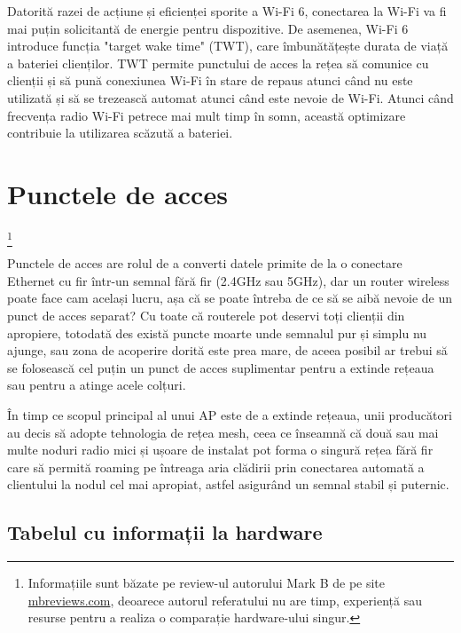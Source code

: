 \documentclass[a4paper,12pt]{report}
\def\oldchapter{} \let\oldchapter=\chapter{}
\def\chapter{\stepcounter{num_chapters}\oldchapter}
\begin{document}
Datorită razei de acțiune și eficienței sporite a Wi-Fi 6, conectarea la Wi-Fi va fi mai puțin solicitantă de energie pentru dispozitive.
De asemenea, Wi-Fi 6 introduce funcția "target wake time" (TWT), care îmbunătățește durata de viață a bateriei clienților.
TWT permite punctului de acces la rețea să comunice cu clienții și să pună conexiunea Wi-Fi în stare de repaus atunci când nu este utilizată și să se trezească automat atunci când este nevoie de Wi-Fi.
Atunci când frecvența radio Wi-Fi petrece mai mult timp în somn, această optimizare contribuie la utilizarea scăzută a bateriei.


\chapter{Punctele de acces}

\footnote{Informațiile sunt băzate pe review-ul autorului Mark B de pe site \url{mbreviews.com}, deoarece autorul referatului nu are timp, experiență sau resurse pentru a realiza o comparație hardware-ului singur.}

Punctele de acces are rolul de a converti datele primite de la o conectare Ethernet cu fir într-un semnal fără fir (2.4GHz sau 5GHz), dar un router wireless poate face cam același lucru, așa că se poate întreba de ce să se aibă nevoie de un punct de acces separat?
Cu toate că routerele pot deservi toți clienții din apropiere, totodată des există puncte moarte unde semnalul pur și simplu nu ajunge, sau zona de acoperire dorită este prea mare, de aceea posibil ar trebui să se folosească cel puțin un punct de acces suplimentar pentru a extinde rețeaua sau pentru a atinge acele colțuri.

În timp ce scopul principal al unui AP este de a extinde rețeaua, unii producători au decis să adopte tehnologia de rețea mesh, ceea ce înseamnă că două sau mai multe noduri radio mici și ușoare de instalat pot forma o singură rețea fără fir care să permită roaming pe întreaga aria clădirii prin conectarea automată a clientului la nodul cel mai apropiat, astfel asigurând un semnal stabil și puternic.

\section{Tabelul cu informații la hardware}
\end{document}
